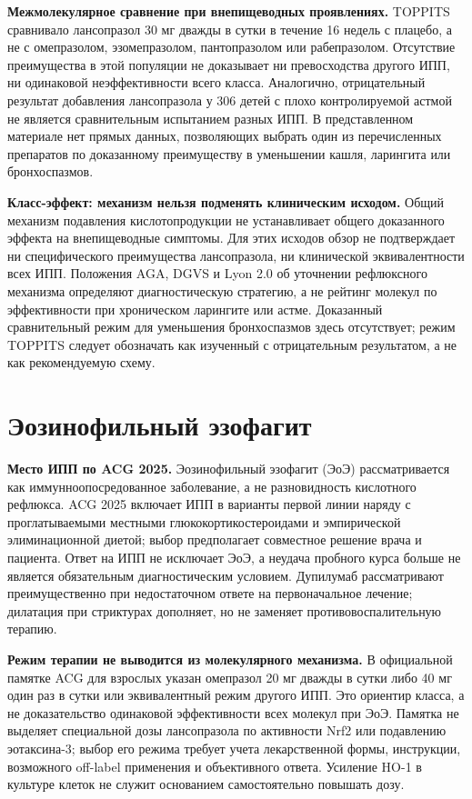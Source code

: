 \documentclass[11pt,a4paper,notitlepage]{report}
\newcommand{\src}[1]{\unskip\space\cite{#1}}
\begin{document}
\textbf{Межмолекулярное сравнение при внепищеводных проявлениях.} TOPPITS сравнивало лансопразол 30 мг дважды в сутки в течение 16 недель с плацебо, а не с омепразолом, эзомепразолом, пантопразолом или рабепразолом. Отсутствие преимущества в этой популяции не доказывает ни превосходства другого ИПП, ни одинаковой неэффективности всего класса. Аналогично, отрицательный результат добавления лансопразола у 306 детей с плохо контролируемой астмой не является сравнительным испытанием разных ИПП. В представленном материале нет прямых данных, позволяющих выбрать один из перечисленных препаратов по доказанному преимуществу в уменьшении кашля, ларингита или бронхоспазмов.\src{toppits,asthma}

\textbf{Класс-эффект: механизм нельзя подменять клиническим исходом.} Общий механизм подавления кислотопродукции не устанавливает общего доказанного эффекта на внепищеводные симптомы. Для этих исходов обзор не подтверждает ни специфического преимущества лансопразола, ни клинической эквивалентности всех ИПП. Положения AGA, DGVS и Lyon 2.0 об уточнении рефлюксного механизма определяют диагностическую стратегию, а не рейтинг молекул по эффективности при хроническом ларингите или астме. Доказанный сравнительный режим для уменьшения бронхоспазмов здесь отсутствует; режим TOPPITS следует обозначать как изученный с отрицательным результатом, а не как рекомендуемую схему.\src{pharmalabel,agagerd,dgvs,lyon,toppits,asthma}

\section{Эозинофильный эзофагит}
\label{sec:eoe}
\textbf{Место ИПП по ACG 2025.} Эозинофильный эзофагит (ЭоЭ) рассматривается как иммунноопосредованное заболевание, а не разновидность кислотного рефлюкса. ACG 2025 включает ИПП в варианты первой линии наряду с проглатываемыми местными глюкокортикостероидами и эмпирической элиминационной диетой; выбор предполагает совместное решение врача и пациента. Ответ на ИПП не исключает ЭоЭ, а неудача пробного курса больше не является обязательным диагностическим условием. Дупилумаб рассматривают преимущественно при недостаточном ответе на первоначальное лечение; дилатация при стриктурах дополняет, но не заменяет противовоспалительную терапию.\src{eoe,eoeguide,eoehighlights2025}

\textbf{Режим терапии не выводится из молекулярного механизма.} В официальной памятке ACG для взрослых указан омепразол 20 мг дважды в сутки либо 40 мг один раз в сутки или эквивалентный режим другого ИПП. Это ориентир класса, а не доказательство одинаковой эффективности всех молекул при ЭоЭ. Памятка не выделяет специальной дозы лансопразола по активности Nrf2 или подавлению эотаксина-3; выбор его режима требует учета лекарственной формы, инструкции, возможного off-label применения и объективного ответа. Усиление HO-1 в культуре клеток не служит основанием самостоятельно повышать дозу.\src{eoehighlights2025,molnrf2}
\end{document}
